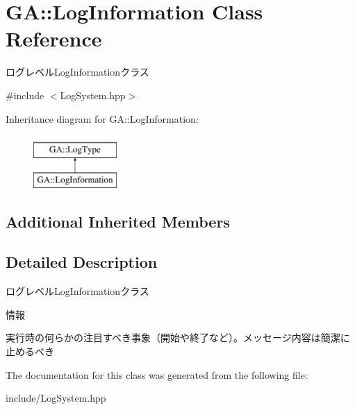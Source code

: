 \hypertarget{class_g_a_1_1_log_information}{}\section{GA\+::Log\+Information Class Reference}
\label{class_g_a_1_1_log_information}


ログレベル\+Log\+Informationクラス  




{\ttfamily \#include $<$Log\+System.\+hpp$>$}

Inheritance diagram for GA\+::Log\+Information\+:\begin{figure}[H]
\begin{center}
\leavevmode
\includegraphics[height=2.000000cm]{class_g_a_1_1_log_information}
\end{center}
\end{figure}
\subsection*{Additional Inherited Members}


\subsection{Detailed Description}
ログレベル\+Log\+Informationクラス 

情報

実行時の何らかの注目すべき事象（開始や終了など）。メッセージ内容は簡潔に止めるべき 

The documentation for this class was generated from the following file\+:\begin{DoxyCompactItemize}
\item 
include/Log\+System.\+hpp\end{DoxyCompactItemize}
